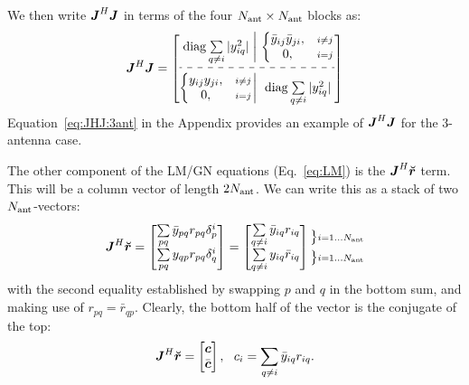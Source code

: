 \documentclass[useAMS,usenatbib]{mn2e}
\makeatletter
\newcommand{\mat}[1]{{\bmath{#1}}}
\newcommand{\JJ}{\mat{J}} %
\newcommand{\Matrix}[2]{\left [ \begin{array}{@{}#1@{}}#2\end{array} \right ]}
\newcommand{\Stack}[1]{\begin{array}{@{}c@{}}#1\end{array}}
\newcommand{\AUG}[1]{\bmath{\breve{#1}}}
\newcommand{\Rr}{\AUG{r}}
\numberwithin{equation}{section}
\makeatother
\begin{document}
\newcommand{\JHJblocksFull}[4]{
\Matrix{c@{}c@{}c}{
 #1 & \bigg |~ & #2 \\[10pt]
 \hdashline \\[-8pt]
 #3 & \bigg |~ & #4 }
}

\newcommand{\JHJblocks}[2]{
\Matrix{c@{}c@{}c}{
 #1 & \big |~ & \nearrow^H \\
 \hdashline \\[-8pt]
 #2 & \bigg |~ & \searrow~~ }
}

We then write $\JJ^H\JJ$ in terms of the four $N_\mathrm{ant}\times N_\mathrm{ant}$ blocks as:
\begin{equation}
\label{eq:JHJ:DI}
\JJ^H \JJ = 
\JHJblocksFull{
\mathrm{diag} \sum\limits_{q\ne i} |y_{iq}^2| 
}{
  \left \{ 
  \begin{array}{@{}cc@{}}
   \bar{y}_{ij} \bar{y}_{ji}, &{\scriptstyle i\ne j} \\
   0, &{\scriptstyle i=j}
  \end{array} \right .
}{
  \left \{ 
  \begin{array}{@{}cc@{}}
   y_{ij}y_{ji},&{\scriptstyle i\ne j} \\
   0, &{\scriptstyle i=j}
  \end{array} \right . 
}{
  \mathrm{diag} \sum\limits_{q\ne i} |y^2_{iq}| 
}
\end{equation}
Equation~\ref{eq:JHJ:3ant} in the Appendix provides an example of $\JJ^H\JJ$ for the 3-antenna case. 

\newcommand{\yysq}[2]{{y^2_{#1}+y^2_{#2}}}
\newcommand{\bb}[2]{{\bar{y}_{#1#2}\bar{y}_{#2#1}}}
\newcommand{\bbb}[2]{y_{#1#2}y_{#2#1}}

The other component of the LM/GN equations (Eq.~\ref{eq:LM}) is the $\JJ^H\Rr$ term. This will be a column vector of length $2N_\mathrm{ant}$. We can write this as a stack of two $N_\mathrm{ant}$-vectors:
\begin{equation}
\label{eq:JHR:DI}
\JJ^H\Rr = \Matrix{c}{ 
\sum\limits_{pq} \bar{y}_{pq} r_{pq} \delta^{i}_p  \\
\sum\limits_{pq} y_{qp} r_{pq} \delta^{i}_q 
} = \Matrix{c}{
\sum\limits_{q\ne i} \bar{y}_{iq} r_{iq}   \\
\sum\limits_{q\ne i} y_{iq} \bar{r}_{iq}  
}
\Stack{
\bm{\big\}} \scriptstyle i=1\dots \Na \\[1ex] 
\bm{\big\}} \scriptstyle i=1\dots \Na
}
\end{equation}
with the second equality established by swapping $p$ and $q$ in the bottom sum, and making use of $r_{pq}=\bar{r}_{qp}$. Clearly, the bottom half of the vector is the conjugate of the top:
\begin{equation}
\label{eq:JHR:DI1}
\JJ^H\Rr = \Matrix{c}{\bmath{c}\\\bar{\bmath{c}}},~~c_i = \sum\limits_{q\ne i} \bar{y}_{iq} r_{iq}.
\end{equation}
\end{document}
